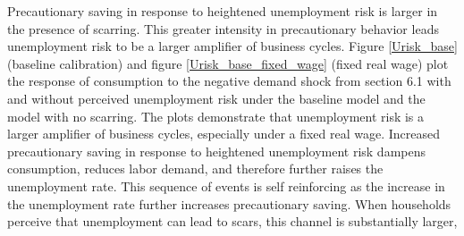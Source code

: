 Precautionary saving in response to heightened unemployment risk is larger in the presence of scarring. This greater intensity in precautionary behavior leads unemployment risk to be a larger amplifier of business cycles. Figure \ref{Urisk_base} (baseline calibration) and figure \ref{Urisk_base_fixed_wage} (fixed real wage) plot the response of consumption to the negative demand shock from section 6.1 with and without perceived unemployment risk under the baseline model and the model with no scarring. The plots demonstrate that unemployment risk is a larger amplifier of business cycles, especially under a fixed real wage.  Increased precautionary saving in response to heightened unemployment risk dampens consumption, reduces labor demand, and therefore further raises the unemployment rate. This sequence of events is self reinforcing as the increase in the unemployment rate further increases precautionary saving. When households perceive that unemployment can lead to scars, this channel is substantially larger,




